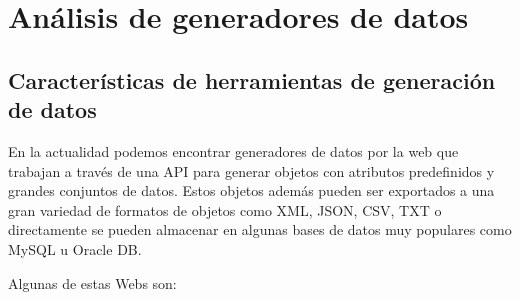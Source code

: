 \chapter{Análisis de generadores de datos\label{02estadoArte}}

\section{Características de herramientas de generación de datos}

En la actualidad podemos encontrar generadores de datos por la web que trabajan a través de una API para generar objetos con atributos predefinidos y grandes conjuntos de datos. Estos objetos además pueden ser exportados a una gran variedad de formatos de objetos como XML, JSON, CSV, TXT o directamente se pueden almacenar en algunas bases de datos muy populares como MySQL u Oracle DB.

Algunas de estas Webs son:

